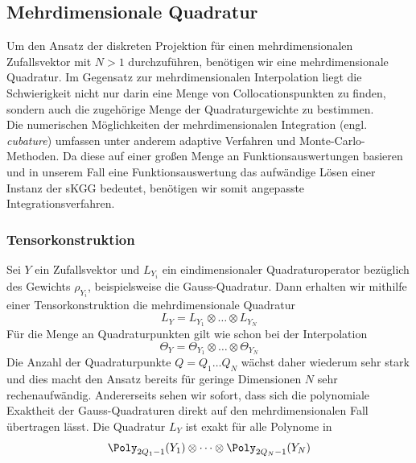 \subsection{Mehrdimensionale Quadratur}
Um den Ansatz der diskreten Projektion für einen mehrdimensionalen Zufallsvektor mit $N>1$ durchzuführen, benötigen wir eine mehrdimensionale Quadratur. Im Gegensatz zur mehrdimensionalen Interpolation liegt die Schwierigkeit nicht nur darin eine Menge von Collocationspunkten zu finden, sondern auch die zugehörige Menge der Quadraturgewichte zu bestimmen.\\
Die numerischen Möglichkeiten der mehrdimensionalen Integration (engl. \emph{cubature}) umfassen unter anderem adaptive Verfahren und Monte-Carlo-Methoden. Da diese auf einer großen Menge an Funktionsauswertungen basieren und in unserem Fall eine Funktionsauswertung das aufwändige Lösen einer Instanz der sKGG bedeutet, benötigen wir somit angepasste Integrationsverfahren.
\subsubsection{Tensorkonstruktion}
Sei $Y$ ein Zufallsvektor und $L_{Y_i}$ ein eindimensionaler Quadraturoperator bezüglich des Gewichts $\rho_{Y_i}$, beispielsweise die Gauss-Quadratur. Dann erhalten wir mithilfe einer Tensorkonstruktion die mehrdimensionale Quadratur
\[L_Y=L_{Y_1}\otimes\dots\otimes L_{Y_N}\]
Für die Menge an Quadraturpunkten gilt wie schon bei der Interpolation
\[\Theta_Y=\Theta_{Y_1}\otimes\dots\otimes \Theta_{Y_N}\]
Die Anzahl der Quadraturpunkte $Q=Q_1\dots Q_N$ wächst daher wiederum sehr stark und dies macht den Ansatz bereits für geringe Dimensionen $N$ sehr rechenaufwändig. Andererseits sehen wir sofort, dass sich die polynomiale Exaktheit der Gauss-Quadraturen direkt auf den mehrdimensionalen Fall übertragen lässt. Die Quadratur $L_Y$ ist exakt für alle Polynome in
\[\Poly_{2Q_1-1}(Y_1)\otimes\dots\otimes\Poly_{2Q_N-1}(Y_N)\]
